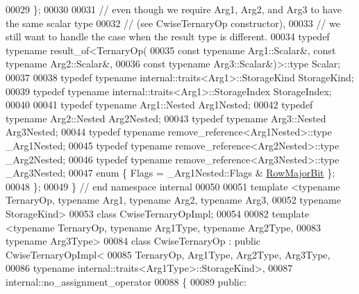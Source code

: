 \begin{DoxyCode}
00029   \};
00030 
00031   \textcolor{comment}{// even though we require Arg1, Arg2, and Arg3 to have the same scalar type}
00032   \textcolor{comment}{// (see CwiseTernaryOp constructor),}
00033   \textcolor{comment}{// we still want to handle the case when the result type is different.}
00034   \textcolor{keyword}{typedef} \textcolor{keyword}{typename} result\_of<TernaryOp(
00035       \textcolor{keyword}{const} \textcolor{keyword}{typename} Arg1::Scalar&, \textcolor{keyword}{const} \textcolor{keyword}{typename} Arg2::Scalar&,
00036       \textcolor{keyword}{const} \textcolor{keyword}{typename} Arg3::Scalar&)>::type Scalar;
00037 
00038   \textcolor{keyword}{typedef} \textcolor{keyword}{typename} internal::traits<Arg1>::StorageKind StorageKind;
00039   \textcolor{keyword}{typedef} \textcolor{keyword}{typename} internal::traits<Arg1>::StorageIndex StorageIndex;
00040 
00041   \textcolor{keyword}{typedef} \textcolor{keyword}{typename} Arg1::Nested Arg1Nested;
00042   \textcolor{keyword}{typedef} \textcolor{keyword}{typename} Arg2::Nested Arg2Nested;
00043   \textcolor{keyword}{typedef} \textcolor{keyword}{typename} Arg3::Nested Arg3Nested;
00044   \textcolor{keyword}{typedef} \textcolor{keyword}{typename} remove\_reference<Arg1Nested>::type \_Arg1Nested;
00045   \textcolor{keyword}{typedef} \textcolor{keyword}{typename} remove\_reference<Arg2Nested>::type \_Arg2Nested;
00046   \textcolor{keyword}{typedef} \textcolor{keyword}{typename} remove\_reference<Arg3Nested>::type \_Arg3Nested;
00047   \textcolor{keyword}{enum} \{ Flags = \_Arg1Nested::Flags & \hyperlink{group__flags_gae4f56c2a60bbe4bd2e44c5b19cbe8762}{RowMajorBit} \};
00048 \};
00049 \}  \textcolor{comment}{// end namespace internal}
00050 
00051 \textcolor{keyword}{template} <\textcolor{keyword}{typename} TernaryOp, \textcolor{keyword}{typename} Arg1, \textcolor{keyword}{typename} Arg2, \textcolor{keyword}{typename} Arg3,
00052           \textcolor{keyword}{typename} StorageKind>
00053 \textcolor{keyword}{class }CwiseTernaryOpImpl;
00054 
00082 \textcolor{keyword}{template} <\textcolor{keyword}{typename} TernaryOp, \textcolor{keyword}{typename} Arg1Type, \textcolor{keyword}{typename} Arg2Type,
00083           \textcolor{keyword}{typename} Arg3Type>
00084 \textcolor{keyword}{class }CwiseTernaryOp : \textcolor{keyword}{public} CwiseTernaryOpImpl<
00085                            TernaryOp, Arg1Type, Arg2Type, Arg3Type,
00086                            typename internal::traits<Arg1Type>::StorageKind>,
00087                        internal::no\_assignment\_operator
00088 \{
00089  \textcolor{keyword}{public}:

\end{DoxyCode}
